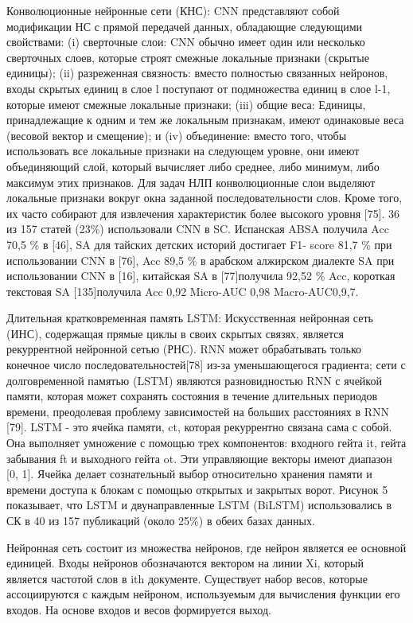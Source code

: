 Конволюционные нейронные сети (КНС): CNN представляют собой модификации НС с
прямой передачей данных, обладающие следующими свойствами: (i) сверточные слои:
CNN обычно имеет один или несколько сверточных слоев, которые строят смежные
локальные признаки (скрытые единицы); (ii) разреженная связность: вместо
полностью связанных нейронов, входы скрытых единиц в слое l поступают от
подмножества единиц в слое l-1, которые имеют смежные локальные признаки; (iii)
общие веса: Единицы, принадлежащие к одним и тем же локальным признакам, имеют
одинаковые веса (весовой вектор и смещение); и (iv) объединение: вместо того,
чтобы использовать все локальные признаки на следующем уровне, они имеют
объединяющий слой, который вычисляет либо среднее, либо минимум, либо максимум
этих признаков. Для задач НЛП конволюционные слои выделяют локальные признаки
вокруг окна заданной последовательности слов. Кроме того, их часто собирают для
извлечения характеристик более высокого уровня [75]. 36 из 157 статей (23\%)
использовали CNN в SC. Испанская ABSA получила Acc 70,5 \% в [46], SA для тайских
детских историй достигает F1- score 81,7 \% при использовании CNN в [76], Acc
89,5 \% в арабском алжирском диалекте SA при использовании CNN в [16], китайская
SA в [77]получила 92,52 \% Acc, короткая текстовая SA [135]получила Acc 0,92
Micro-AUC 0,98 Macro-AUC0,9,7.~\cite{article2}

Длительная кратковременная память LSTM: Искусственная нейронная сеть (ИНС),
содержащая прямые циклы в своих скрытых связях, является рекуррентной нейронной
сетью (РНС). RNN может обрабатывать только конечное число
последовательностей[78] из-за уменьшающегося градиента; сети с долговременной
памятью (LSTM) являются разновидностью RNN с ячейкой памяти, которая может
сохранять состояния в течение длительных периодов времени, преодолевая проблему
зависимостей на больших расстояниях в RNN [79]. LSTM - это ячейка памяти, ct,
которая рекуррентно связана сама с собой. Она выполняет умножение с помощью трех
компонентов: входного гейта it, гейта забывания ft и выходного гейта ot. Эти
управляющие векторы имеют диапазон [0, 1]. Ячейка делает сознательный выбор
относительно хранения памяти и времени доступа к блокам с помощью открытых и
закрытых ворот. Рисунок 5 показывает, что LSTM и двунаправленные LSTM (BiLSTM)
использовались в СК в 40 из 157 публикаций (около 25\%) в обеих базах данных.
\cite{article2}

Нейронная сеть состоит из множества нейронов, где нейрон является ее основной
единицей. Входы нейронов обозначаются вектором на линии Xi, который является
частотой слов в ith документе. Существует набор весов, которые ассоциируются с
каждым нейроном, используемым для вычисления функции его входов. На основе
входов и весов формируется выход.~\cite{article4}

